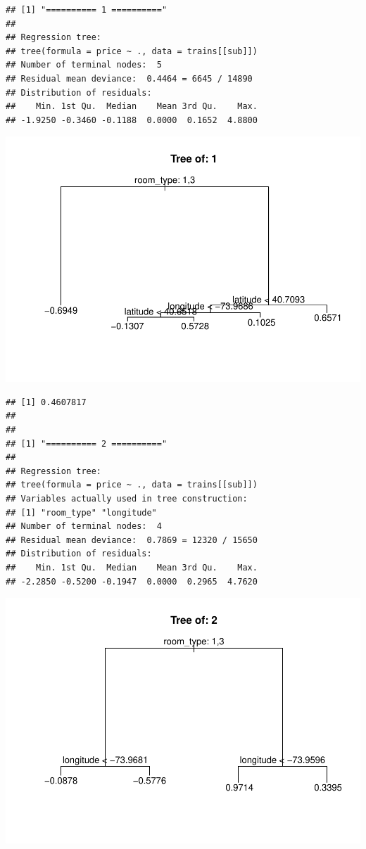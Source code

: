 \documentclass[
]{article}
\begin{document}
\begin{verbatim}
## [1] "========== 1 =========="
## 
## Regression tree:
## tree(formula = price ~ ., data = trains[[sub]])
## Number of terminal nodes:  5 
## Residual mean deviance:  0.4464 = 6645 / 14890 
## Distribution of residuals:
##    Min. 1st Qu.  Median    Mean 3rd Qu.    Max. 
## -1.9250 -0.3460 -0.1188  0.0000  0.1652  4.8800
\end{verbatim}

\includegraphics{project-code_files/figure-latex/unnamed-chunk-14-1.pdf}

\begin{verbatim}
## [1] 0.4607817
## 
## 
## [1] "========== 2 =========="
## 
## Regression tree:
## tree(formula = price ~ ., data = trains[[sub]])
## Variables actually used in tree construction:
## [1] "room_type" "longitude"
## Number of terminal nodes:  4 
## Residual mean deviance:  0.7869 = 12320 / 15650 
## Distribution of residuals:
##    Min. 1st Qu.  Median    Mean 3rd Qu.    Max. 
## -2.2850 -0.5200 -0.1947  0.0000  0.2965  4.7620
\end{verbatim}

\includegraphics{project-code_files/figure-latex/unnamed-chunk-14-2.pdf}
\end{document}
